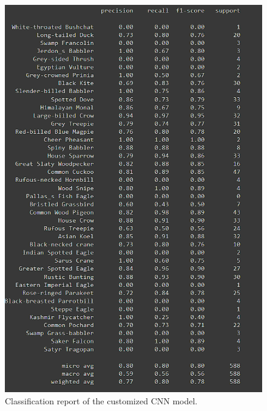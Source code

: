 \begin{figure}[h!]
    \centering
    \includegraphics[scale=0.5]{images/classification_report.png}
    \caption{Classification report of the customized CNN model.}
    \label{fig:Classification report}
\end{figure}

